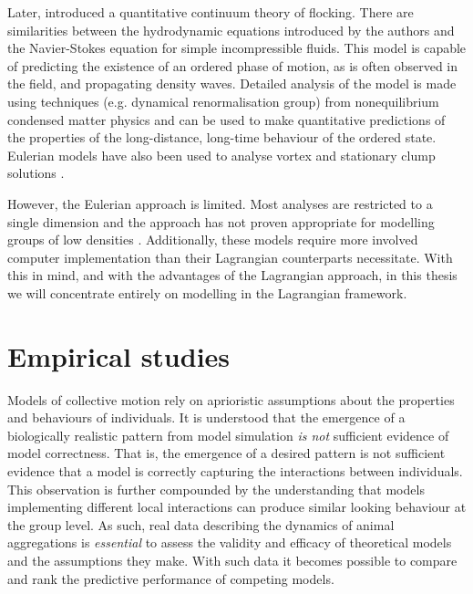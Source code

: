 Later, \textcite{toner98} introduced a quantitative continuum theory of
flocking. There are similarities between the hydrodynamic equations introduced
by the authors and the Navier-Stokes equation for simple incompressible fluids.
This model is capable of predicting the existence of an ordered phase of
motion, as is often observed in the field, and propagating density waves.
Detailed analysis of the model is made using techniques (e.g. dynamical
renormalisation group) from nonequilibrium condensed matter physics and can be
used to make quantitative predictions of the properties of the long-distance,
long-time behaviour of the ordered state. Eulerian models have also been used
to analyse vortex and stationary clump solutions \parencite{topaz04,topaz06}.

However, the Eulerian approach is limited. Most analyses are restricted to a
single dimension and the approach has not proven appropriate for modelling
groups of low densities \parencite{giardina08}. Additionally, these models
require more involved computer implementation than their Lagrangian
counterparts necessitate. With this in mind, and with the advantages of the
Lagrangian approach, in this thesis we will concentrate entirely on modelling
in the Lagrangian framework.

\section{Empirical studies}
\label{sec:empirical_studies}

Models of collective motion rely on aprioristic assumptions about the
properties and behaviours of individuals. It is understood that the emergence
of a biologically realistic pattern from model simulation \emph{is not}
sufficient evidence of model correctness. That is, the emergence of a desired
pattern is not sufficient evidence that a model is correctly capturing the
interactions between individuals. This observation is further compounded by the
understanding that models implementing different local interactions can produce
similar looking behaviour at the group level. As such, real data describing the
dynamics of animal aggregations is \emph{essential} to assess the validity and
efficacy of theoretical models and the assumptions they make. With such data it
becomes possible to compare and rank the predictive performance of competing
models.

